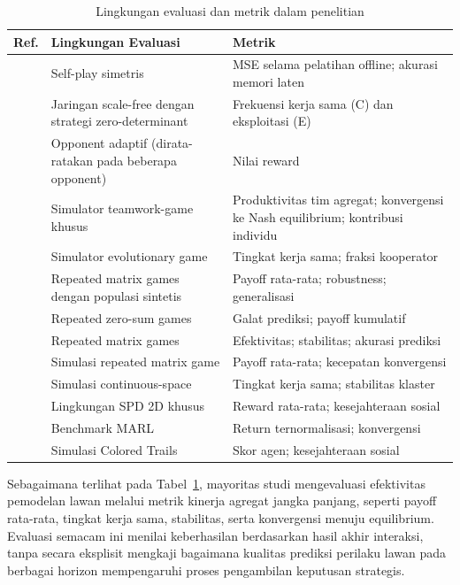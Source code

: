 \begin{table}[!htbp]
\centering
\caption{Lingkungan evaluasi dan metrik dalam penelitian}\label{tab:evaluation_metrics}
\renewcommand{\arraystretch}{1.2}
\setlength{\tabcolsep}{4pt}
\begin{tabularx}{\columnwidth}{c >{\raggedright\arraybackslash}X >{\raggedright\arraybackslash}X}
\midrule
\textbf{Ref.} & \textbf{Lingkungan Evaluasi} & \textbf{Metrik} \\
\midrule
~\cite{qiao_o2m_2024} & Self-play simetris & MSE selama pelatihan offline; akurasi memori laten \\
~\cite{zhu_evolutionary_2025} & Jaringan scale-free dengan strategi zero-determinant & Frekuensi kerja sama (C) dan eksploitasi (E) \\
~\cite{lv_inducing_2023} & Opponent adaptif (dirata-ratakan pada beberapa opponent) & Nilai reward \\
~\cite{gomez_grounded_2025} & Simulator teamwork-game khusus & Produktivitas tim agregat; konvergensi ke Nash equilibrium; kontribusi individu \\
~\cite{di_coupling_2023} & Simulator evolutionary game & Tingkat kerja sama; fraksi kooperator \\
~\cite{perera_learning_2025} & Repeated matrix games dengan populasi sintetis & Payoff rata-rata; robustness; generalisasi \\
~\cite{li_exploiting_2025} & Repeated zero-sum games & Galat prediksi; payoff kumulatif \\
~\cite{freire_modeling_2023} & Repeated matrix games & Efektivitas; stabilitas; akurasi prediksi \\
~\cite{hu_modeling_2023} & Simulasi repeated matrix game & Payoff rata-rata; kecepatan konvergensi \\
~\cite{elhamer_effects_2020} & Simulasi continuous-space & Tingkat kerja sama; stabilitas klaster \\
~\cite{wang_achieving_2019} & Lingkungan SPD 2D khusus & Reward rata-rata; kesejahteraan sosial \\
~\cite{jin_achieving_2025} & Benchmark MARL & Return ternormalisasi; konvergensi \\
~\cite{de_weerd_higher-order_2022} & Simulasi Colored Trails & Skor agen; kesejahteraan sosial \\
\midrule
\end{tabularx}
\end{table}

Sebagaimana terlihat pada Tabel~\ref{tab:evaluation_metrics}, mayoritas studi mengevaluasi efektivitas pemodelan lawan melalui metrik kinerja agregat jangka panjang, seperti payoff rata-rata, tingkat kerja sama, stabilitas, serta konvergensi menuju equilibrium. Evaluasi semacam ini menilai keberhasilan berdasarkan hasil akhir interaksi, tanpa secara eksplisit mengkaji bagaimana kualitas prediksi perilaku lawan pada berbagai horizon mempengaruhi proses pengambilan keputusan strategis.

